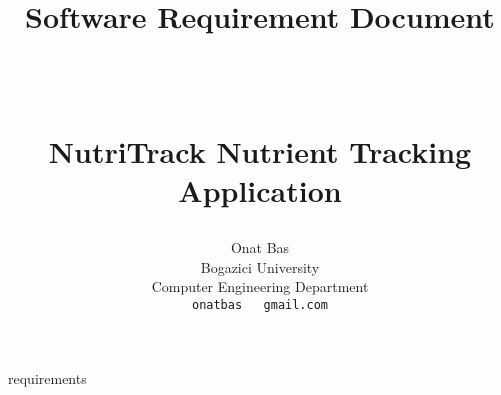 \documentclass[paper=a4, fontsize=11pt]{scrartcl}
\title{
	\huge \strut Software Requirement Document \strut \\
	\Large \bfseries \strut NutriTrack Nutrient Tracking Application \strut
}
\author{ 									\usefont{OT1}{bch}{m}{n}
        Onat Bas\\
        Bogazici University\\
        Computer Engineering Department\\
        \texttt{onatbas ~ gmail.com}
}
\begin{document}
\maketitle
\newpage


\newpage
 {requirements}
\end{document}
